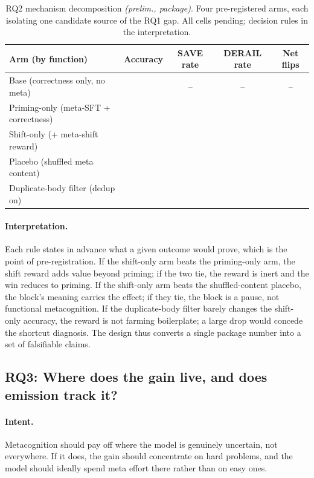 \begin{table}[t]
\caption{RQ2 mechanism decomposition \emph{(prelim., package)}. Four
pre-registered arms, each isolating one candidate source of the RQ1 gap. All
cells pending; decision rules in the interpretation.}
\label{tab:t2}
\begin{center}
\small
\begin{tabular}{lcccc}
\toprule
Arm (by function) & Accuracy & SAVE rate & DERAIL rate & Net flips \\
\midrule
Base (correctness only, no meta)        & \todo{} & --      & --      & --      \\
Priming-only (meta-SFT + correctness)   & \todo{} & \todo{} & \todo{} & \todo{} \\
Shift-only (+ meta-shift reward)        & \todo{} & \todo{} & \todo{} & \todo{} \\
Placebo (shuffled meta content)         & \todo{} & \todo{} & \todo{} & \todo{} \\
Duplicate-body filter (dedup on)        & \todo{} & \todo{} & \todo{} & \todo{} \\
\bottomrule
\end{tabular}
\end{center}
\end{table}

\paragraph{Interpretation.} Each rule states in advance what a given outcome
would prove, which is the point of pre-registration. If the shift-only arm beats
the priming-only arm, the shift reward adds value beyond priming; if the two tie,
the reward is inert and the win reduces to priming. If the shift-only arm beats
the shuffled-content placebo, the block's meaning carries the effect; if they
tie, the block is a pause, not functional metacognition. If the duplicate-body
filter barely changes the shift-only accuracy, the reward is not farming
boilerplate; a large drop would concede the shortcut diagnosis. The design thus
converts a single package number into a set of falsifiable claims.

\subsection{RQ3: Where does the gain live, and does emission track it?}
\label{sec:exp:rq3}

\paragraph{Intent.} Metacognition should pay off where the model is genuinely
uncertain, not everywhere. If it does, the gain should concentrate on hard
problems, and the model should ideally spend meta effort there rather than on
easy ones.

